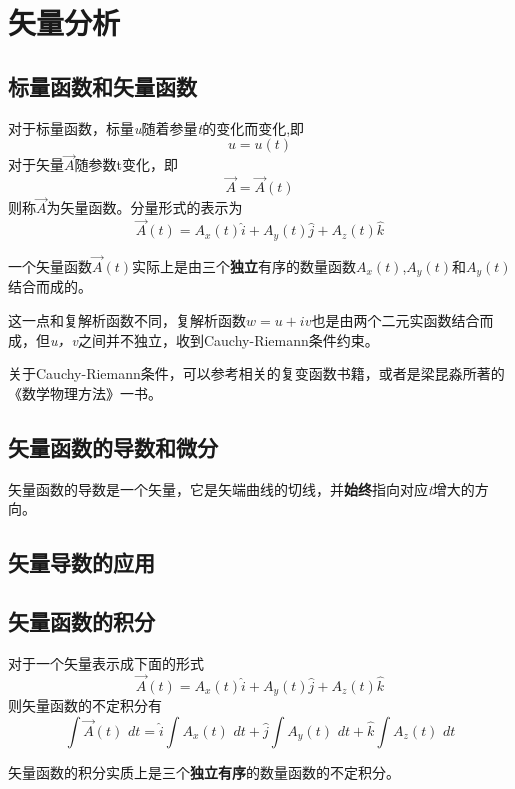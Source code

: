 \chapter{矢量分析}
\section{标量函数和矢量函数}
对于标量函数，标量\textit{u}随着参量\textit{t}的变化而变化,即
\[u=u(t)\]
\noindent
对于矢量$\vec{A}$随参数t变化，即
\[
\vec{A}=\vec{A}\left(t\right)
\]
则称$\vec{A}$为矢量函数。分量形式的表示为
\[
\vec{A}\left(t\right)=A_x\left( t \right) \hat{i}+A_y\left( t \right) \hat{j}+A_z\left( t \right) \hat{k}
\]


\begin{newdef}[]
	一个矢量函数$\vec{A}\left(t\right)$实际上是由三个\textbf{独立}有序的数量函数$A_x\left(t\right)$,$A_y\left(t\right)$和$A_y\left(t\right)$结合而成的。
	
	这一点和复解析函数不同，复解析函数$w=u+\textit{i}v$也是由两个二元实函数结合而成，但\textit{u，v}之间并不独立，收到Cauchy-Riemann条件约束。
	
	关于Cauchy-Riemann条件，可以参考相关的复变函数书籍，或者是梁昆淼所著的《数学物理方法》一书。
\end{newdef}

\section{矢量函数的导数和微分}

\begin{newdef}[]
	矢量函数的导数是一个矢量，它是矢端曲线的切线，并\textbf{始终}指向对应\textit{t}增大的方向。
\end{newdef}



\section{矢量导数的应用}
	
	
\section{矢量函数的积分}
对于一个矢量表示成下面的形式
	\[
	\vec{A}\left(t\right)=A_x\left( t \right) \hat{i}+A_y\left( t \right) \hat{j}+A_z\left( t \right) \hat{k}
	\]
	则矢量函数的不定积分有
	\[
	\int{\vec{A}\left( t \right)}\,\,\mathit{d}t=\hat{i}\int{A_x\left( t \right)}\,\,\mathit{d}t+\hat{j}\int{A_y\left( t \right)}\,\,\mathit{d}t+\hat{k}\int{A_z\left( t \right)}\,\,\mathit{d}t
	\]
\begin{newdef}[]
	矢量函数的积分实质上是三个\textbf{独立有序}的数量函数的不定积分。
\end{newdef}


